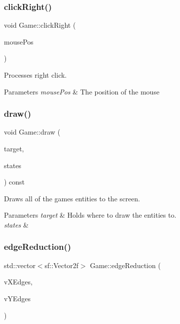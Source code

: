 \subsubsection{\texorpdfstring{click\+Right()}{clickRight()}}
{\footnotesize\ttfamily void Game\+::click\+Right (\begin{DoxyParamCaption}\item[{sf\+::\+Vector2i}]{mouse\+Pos }\end{DoxyParamCaption})}



Processes right click. 


\begin{DoxyParams}{Parameters}
{\em mouse\+Pos} & The position of the mouse \\
\hline
\end{DoxyParams}
\mbox{\label{class_game_a143d1a2f8a527db60f1fe47ab3d854a7}} 
\subsubsection{\texorpdfstring{draw()}{draw()}}
{\footnotesize\ttfamily void Game\+::draw (\begin{DoxyParamCaption}\item[{sf\+::\+Render\+Target \&}]{target,  }\item[{sf\+::\+Render\+States}]{states }\end{DoxyParamCaption}) const\hspace{0.3cm}{\ttfamily [private]}}



Draws all of the game\textquotesingle{}s entities to the screen. 


\begin{DoxyParams}{Parameters}
{\em target} & Holds where to draw the entities to. \\
\hline
{\em states} & \\
\hline
\end{DoxyParams}
\mbox{\label{class_game_aee51d9b94ba43131c09490b7b79f68db}} 
\subsubsection{\texorpdfstring{edge\+Reduction()}{edgeReduction()}}
{\footnotesize\ttfamily std\+::vector$<$sf\+::\+Vector2f$>$ Game\+::edge\+Reduction (\begin{DoxyParamCaption}\item[{std\+::vector$<$ sf\+::\+Vector2f $>$}]{v\+X\+Edges,  }\item[{std\+::vector$<$ sf\+::\+Vector2f $>$}]{v\+Y\+Edges }\end{DoxyParamCaption})}



